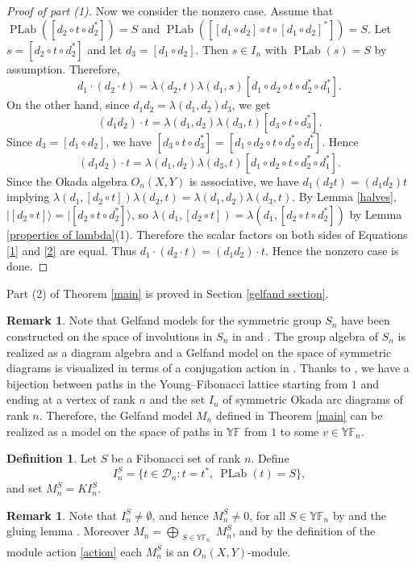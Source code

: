 \documentclass[12pt,reqno]{amsart}
\numberwithin{equation}{section}
\theoremstyle{definition}
\newtheorem{definition}[theorem]{Definition}
\theoremstyle{definition}
\newtheorem{remark}[theorem]{Remark}
\newcommand{\YF}{\mathbb{YF}}
\newcommand{\PLab}{\operatorname{PLab}}
\begin{document}
\begin{proof}[Proof of part (1)]
Now we consider the nonzero case. Assume that $\PLab([d_2\circ t\circ d_2^*])=S$ and $\PLab([[d_1\circ d_2]\circ t\circ [d_1 \circ d_2]^*])=S$.
Let $s=[d_2\circ t\circ d_2^*]$ and let $d_3=[d_1\circ d_2]$. Then $s\in I_n$ with $\PLab(s)=S$ by assumption. Therefore,
\begin{equation}\label{1}
d_1\cdot(d_2\cdot t)
=
\lambda(d_2,t) \lambda(d_1,s)
[d_1\circ d_2\circ t\circ d_2^*\circ d_1^*].
\end{equation}
On the other hand, since $d_1d_2=\lambda(d_1,d_2)d_3$, we get
\begin{equation}\label{2}
(d_1d_2)\cdot t
=
\lambda(d_1,d_2) \lambda(d_3,t)
[d_3\circ t\circ d_3^*].
\end{equation}
Since $d_3=[d_1\circ d_2]$, we have $[d_3\circ t\circ d_3^*]=[d_1\circ d_2\circ t\circ d_2^*\circ d_1^*]$. Hence
\[
(d_1d_2)\cdot t
=
\lambda(d_1,d_2) \lambda(d_3,t)
[d_1\circ d_2\circ t\circ d_2^*\circ d_1^*].
\]
Since the Okada algebra $O_n(X,Y)$ is associative, we have $d_1(d_2t)=(d_1d_2)t$ implying $\lambda(d_1,[d_2 \circ t])\lambda(d_2,t) = \lambda(d_1,d_2)\lambda(d_3,t)$. By Lemma \ref{halves}, $| [d_2 \circ t] \rangle = | [d_2 \circ t \circ d_2^*] \rangle$, so $\lambda(d_1, [d_2 \circ t])= \lambda(d_1, [d_2 \circ t \circ d_2^*])$ by Lemma \ref{properties of lambda}(1). Therefore the scalar factors on both sides of Equations \eqref{1} and \eqref{2} are equal.
Thus $d_1\cdot(d_2\cdot t)=(d_1d_2)\cdot t$. Hence the nonzero case is done.
\end{proof}
Part (2) of Theorem \ref{main} is proved in Section \ref{gelfand section}. 
\begin{remark}
Note that Gelfand models for the symmetric group $S_n$ have been constructed on the space of involutions in $S_n$ in \cite{KodiyalamVerma2004} and \cite{AdinPostnikovRoichman2008}. The group algebra of $S_n$ is realized as a diagram algebra and a Gelfand model on the space of symmetric diagrams is visualized in terms of a conjugation action in \cite[Section 2 and Remarks 4.2 and 4.4]{HalversonReeks}. Thanks to \cite[Proposition~4.13, Theorem~4.14]{HivertScott}, we have a bijection between paths in the Young--Fibonacci lattice starting from $1$ and ending at a vertex of rank $n$ and the set $I_n$ of symmetric Okada arc diagrams of rank $n$. Therefore, the Gelfand model $M_n$ defined in Theorem \ref{main} can be realized as a model on the space of paths in $\YF$ from $1$ to some $v \in \YF_n$.
\end{remark}
\begin{definition}
Let $S$ be a Fibonacci set of rank $n$. Define
\[
I_n^S=\{t\in\mathcal{D}_n : t=t^*,\ \PLab(t)=S\},
\]
and set $M_n^S=KI_n^S$.
\end{definition}
\begin{remark}\label{nonempty}
Note that $I_n^S \neq \emptyset$, and hence $M_n^S \neq 0$, for all $S \in \YF_n$ by \cite[Lemma 5.15]{HivertScott} and the gluing lemma \cite[Lemma 4.4]{HivertScott}. Moreover $M_n= \bigoplus_{\substack{S \in \YF_n}}M_n^S$, and by the definition of the module action \eqref{action} each $M_n^S$ is an $O_n(X,Y)$-module.
\end{remark}
\end{document}
